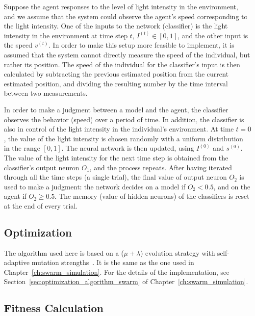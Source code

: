 Suppose the agent responses to the level of light intensity in the environment, and we assume that the system could observe the agent's speed corresponding to the light intensity. One of the inputs to the network (classifier) is the light intensity in the environment at time step $t$, $I^{\left(t\right)}\in [0,1]$, and the other input is the speed $v^{\left(t\right)}$. In order to make this setup more feasible to implement, it is assumed that the system cannot directly measure the speed of the individual, but rather its position. The speed of the individual for the classifier's input is then calculated by subtracting the previous estimated position from the current estimated position, and dividing the resulting number by the time interval between two measurements.

In order to make a judgment between a model and the agent, the classifier observes the behavior (speed) over a period of time. In addition, the classifier is also in control of the light intensity in the individual's environment. At time $t=0$, the value of the light intensity is chosen randomly with a uniform distribution in the range $\left[0,1\right]$. The neural network is then updated, using $I^{\left(0\right)}$ and $s^{\left(0\right)}$. The value of the light intensity for the next time step is obtained from the classifier's output neuron $O_1$, and the process repeats. After having iterated through all the time steps (a single trial), the final value of output neuron $O_2$ is used to make a judgment: the network decides on a model if $O_2<0.5$, and on the agent if $O_2\geq0.5$. The memory (value of hidden neurons) of the classifiers is reset at the end of every trial.

\subsection{Optimization}\label{sec:optimization_algorithm_interaction}

The algorithm used here is based on a ($\mu+\lambda$) evolution strategy with self-adaptive mutation strengths~\cite{Beyer_2001, Beyer2002}. It is the same as the one used in  Chapter~\ref{ch:swarm_simulation}. For the details of the implementation, see Section~\ref{sec:optimization_algorithm_swarm} of Chapter~\ref{ch:swarm_simulation}.

\subsection{Fitness Calculation}\label{sec:fitness_calculation_interaction}


